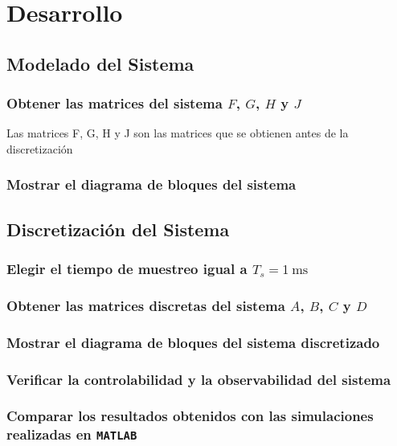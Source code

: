 \section{Desarrollo}

\subsection{Modelado del Sistema}
\subsubsection{Obtener las matrices del sistema $F$, $G$, $H$ y $J$}
Las matrices F, G, H y J son las matrices que se obtienen antes de la discretización

\subsubsection{Mostrar el diagrama de bloques del sistema}

\subsection{Discretización del Sistema}

\subsubsection{Elegir el tiempo de muestreo igual a $T_s = 1~\text{ms}$}

\subsubsection{Obtener las matrices discretas del sistema $A$, $B$, $C$ y $D$}

\subsubsection{Mostrar el diagrama de bloques del sistema discretizado}

\subsubsection{Verificar la controlabilidad y la observabilidad del sistema}

\subsubsection{Comparar los resultados obtenidos con las simulaciones realizadas en \texttt{MATLAB}}



